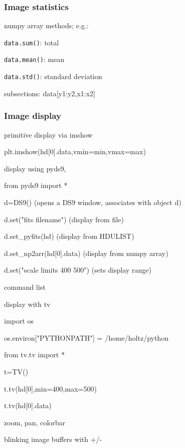 \documentclass{article}
\begin{document}
\subsubsection{Image statistics}
\begin{itemize*}
    \item numpy array methods; e.g.:
        \begin{itemize*}
            \item \texttt{data.sum()}: total
            \item \texttt{data.mean()}: mean
            \item \texttt{data.std()}: standard deviation
        \end{itemize*}
    \item subsections: data[y1:y2,x1:x2]
\end{itemize*}

\subsubsection{Image display}
\begin{itemize*}
    \item primitive display via imshow
        \begin{itemize*}
            \item plt.imshow(hd[0].data,vmin=min,vmax=max)
        \end{itemize*}
    \item display using pyds9,
        \begin{itemize*}
            \item from pyds9 import *
            \item d=DS9() (opens a DS9 window, associates with object d)
            \item d.set("fits filename") (display from file)
            \item d.set\_pyfits(hd) (display from HDULIST)
            \item d.set\_np2arr(hd[0].data) (display from numpy array)
            \item d.set("scale limits 400 500") (sets display range)
            \item command list
        \end{itemize*}
    \item display with tv
        \begin{itemize*}
            \item import os
            \item os.environ["PYTHONPATH"] = /home/holtz/python
            \item from tv.tv import *
            \item t=TV()
            \item t.tv(hd[0],min=400,max=500)
            \item t.tv(hd[0].data)
            \item zoom, pan, colorbar
            \item blinking image buffers with +/-
        \end{itemize*}
\end{itemize*}
\end{document}
